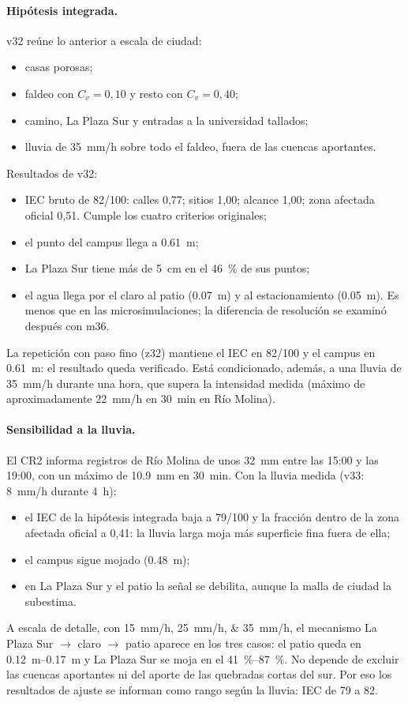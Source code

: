 \paragraph{Hipótesis integrada.} v32 reúne lo anterior a escala de ciudad:
\begin{itemize}
\item casas porosas;
\item faldeo con $C_v=0{,}10$ y resto con $C_v=0{,}40$;
\item camino, La Plaza Sur y entradas a la universidad tallados;
\item lluvia de \SI{35}{mm/h} sobre todo el faldeo, fuera de las cuencas aportantes.
\end{itemize}
Resultados de v32:
\begin{itemize}
\item IEC bruto de 82/100: calles 0,77; sitios 1,00; alcance 1,00; zona afectada oficial 0,51. Cumple los cuatro criterios originales;
\item el punto del campus llega a \SI{0,61}{m};
\item La Plaza Sur tiene más de \SI{5}{cm} en el \SI{46}{\percent} de sus puntos;
\item el agua llega por el claro al patio (\SI{0,07}{m}) y al estacionamiento (\SI{0,05}{m}). Es menos que en las microsimulaciones; la diferencia de resolución se examinó después con m36.
\end{itemize}
La repetición con paso fino (z32) mantiene el IEC en 82/100 y el campus en \SI{0,61}{m}: el resultado queda verificado. Está condicionado, además, a una lluvia de \SI{35}{mm/h} durante una hora, que supera la intensidad medida (máximo de aproximadamente \SI{22}{mm/h} en \SI{30}{min} en Río Molina).

\paragraph{Sensibilidad a la lluvia.} El CR2 informa registros de Río Molina de unos \SI{32}{mm} entre las 15:00 y las 19:00, con un máximo de \SI{10,9}{mm} en \SI{30}{min}. Con la lluvia medida (v33: \SI{8}{mm/h} durante \SI{4}{h}):
\begin{itemize}
\item el IEC de la hipótesis integrada baja a 79/100 y la fracción dentro de la zona afectada oficial a 0,41: la lluvia larga moja más superficie fina fuera de ella;
\item el campus sigue mojado (\SI{0,48}{m});
\item en La Plaza Sur y el patio la señal se debilita, aunque la malla de ciudad la subestima.
\end{itemize}
A escala de detalle, con \SIlist{15;25;35}{mm/h}, el mecanismo La Plaza Sur $\rightarrow$ claro $\rightarrow$ patio aparece en los tres casos: el patio queda en \SIrange{0,12}{0,17}{m} y La Plaza Sur se moja en el \SIrange{41}{87}{\percent}. No depende de excluir las cuencas aportantes ni del aporte de las quebradas cortas del sur. Por eso los resultados de ajuste se informan como rango según la lluvia: IEC de 79 a 82.

